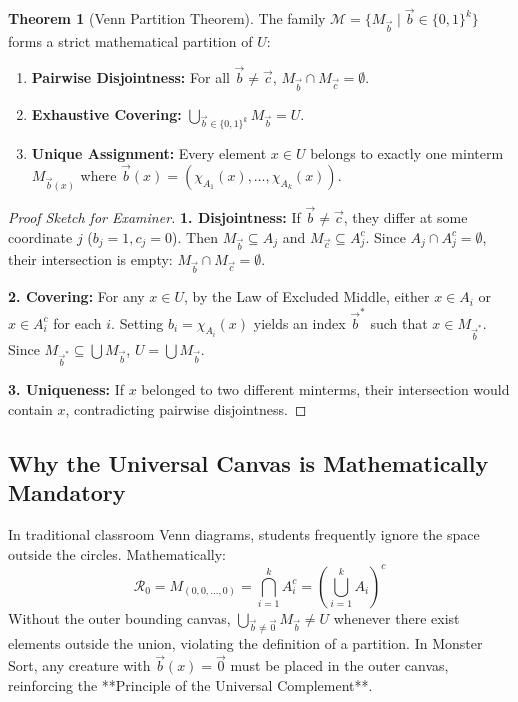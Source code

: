 \documentclass[11pt,a4paper]{article}
\theoremstyle{definition}
\newtheorem{theorem}{Theorem}
\begin{document}
\begin{theorem}[Venn Partition Theorem]
The family $\mathcal{M} = \{M_{\vec{b}} \mid \vec{b} \in \{0, 1\}^k\}$ forms a strict mathematical partition of $U$:
\begin{enumerate}
  \item \textbf{Pairwise Disjointness:} For all $\vec{b} \neq \vec{c}$, $M_{\vec{b}} \cap M_{\vec{c}} = \emptyset$.
  \item \textbf{Exhaustive Covering:} $\bigcup_{\vec{b} \in \{0, 1\}^k} M_{\vec{b}} = U$.
  \item \textbf{Unique Assignment:} Every element $x \in U$ belongs to exactly one minterm $M_{\vec{b}(x)}$ where $\vec{b}(x) = (\chi_{A_1}(x), \dots, \chi_{A_k}(x))$.
\end{enumerate}
\end{theorem}

\begin{proof}[Proof Sketch for Examiner]
\textbf{1. Disjointness:} If $\vec{b} \neq \vec{c}$, they differ at some coordinate $j$ ($b_j = 1, c_j = 0$). Then $M_{\vec{b}} \subseteq A_j$ and $M_{\vec{c}} \subseteq A_j^c$. Since $A_j \cap A_j^c = \emptyset$, their intersection is empty: $M_{\vec{b}} \cap M_{\vec{c}} = \emptyset$.

\textbf{2. Covering:} For any $x \in U$, by the Law of Excluded Middle, either $x \in A_i$ or $x \in A_i^c$ for each $i$. Setting $b_i = \chi_{A_i}(x)$ yields an index $\vec{b}^*$ such that $x \in M_{\vec{b}^*}$. Since $M_{\vec{b}^*} \subseteq \bigcup M_{\vec{b}}$, $U = \bigcup M_{\vec{b}}$.

\textbf{3. Uniqueness:} If $x$ belonged to two different minterms, their intersection would contain $x$, contradicting pairwise disjointness.
\end{proof}

\subsection{Why the Universal Canvas is Mathematically Mandatory}
In traditional classroom Venn diagrams, students frequently ignore the space outside the circles. Mathematically:
$$\mathcal{R}_0 = M_{(0,0,\dots,0)} = \bigcap_{i=1}^k A_i^c = \left(\bigcup_{i=1}^k A_i\right)^c$$
Without the outer bounding canvas, $\bigcup_{\vec{b} \neq \vec{0}} M_{\vec{b}} \neq U$ whenever there exist elements outside the union, violating the definition of a partition. In Monster Sort, any creature with $\vec{b}(x) = \vec{0}$ must be placed in the outer canvas, reinforcing the **Principle of the Universal Complement**.
\end{document}
